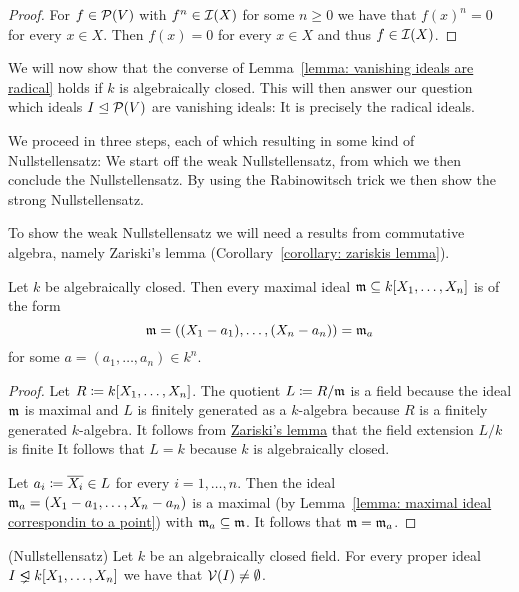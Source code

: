 \begin{proof}
  For $f \in \mathcal{P}(V)$ with $f^n \in \mathcal{I}(X)$ for some $n \geq 0$ we have that $f(x)^n = 0$ for every $x \in X$.
  Then $f(x) = 0$ for every $x \in X$ and thus $f \in \mathcal{I}(X)$.
\end{proof}


\begin{fluff}
  We will now show that the converse of Lemma~\ref{lemma: vanishing ideals are radical} holds if $k$ is algebraically closed.
  This will then answer our question which ideals $I \trianglelefteq \mathcal{P}(V)$ are vanishing ideals:
  It is precisely the radical ideals.
  
  We proceed in three steps, each of which resulting in some kind of Nullstellensatz:
  We start off the weak Nullstellensatz, from which we then conclude the Nullstellensatz.
  By using the Rabinowitsch trick we then show the strong Nullstellensatz.
  
  To show the weak Nullstellensatz we will need a results from commutative algebra, namely Zariski’s lemma (Corollary~\ref{corollary: zariskis lemma}).
\end{fluff}


\begin{theorem}
  \label{theorem: weak nullstellensatz}
  Let $k$ be algebraically closed.
  Then every maximal ideal $\mathfrak{m} \subseteq k[X_1, \dotsc, X_n]$ is of the form
  \[
      \mathfrak{m}
    = ( (X_1 - a_1), \dotsc, (X_n - a_n) )
    = \mathfrak{m}_a
  \]
  for some $a = (a_1, \dotsc, a_n) \in k^n$.
\end{theorem}


\begin{proof}
  Let $R \coloneqq k[X_1, \dotsc, X_n]$.
  The quotient $L \coloneqq R/\mathfrak{m}$ is a field because the ideal $\mathfrak{m}$ is maximal and $L$ is finitely generated as a $k$-algebra because $R$ is a finitely generated $k$-algebra.
  It follows from \hyperref[corollary: zariskis lemma]{Zariski’s lemma} that the field extension $L/k$ is finite
  It follows that $L = k$ because $k$ is algebraically closed.
  
  Let $a_i \coloneqq \overline{X_i} \in L$ for every $i = 1, \dotsc, n$.
  Then the ideal $\mathfrak{m}_a = (X_1 - a_1, \dotsc, X_n - a_n)$ is a maximal (by Lemma~\ref{lemma: maximal ideal correspondin to a point}) with $\mathfrak{m}_a \subseteq \mathfrak{m}$.
  It follows that $\mathfrak{m} = \mathfrak{m}_a$.
\end{proof}


\begin{theorem}(Nullstellensatz)
  \label{theorem: nullstellensatz}
  Let $k$ be an algebraically closed field.
  For every proper ideal $I \ideallneq k[X_1, \dotsc, X_n]$ we have that $\mathcal{V}(I) \neq \emptyset$.
\end{theorem}


